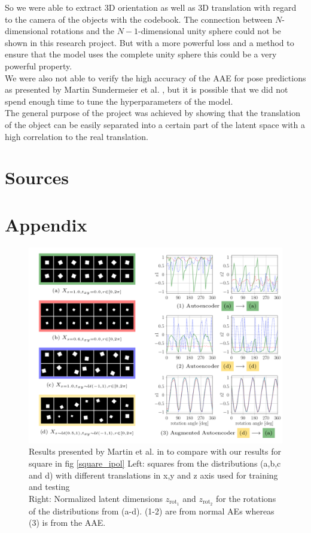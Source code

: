 \documentclass[10pt,a4paper]{article}
\newcommand{\rot}{\ensuremath{\text{rot}\xspace}}
\begin{document}
So we were able to extract 3D orientation as well as 3D translation with regard to the camera of the objects with the codebook.
The connection between $N$-dimensional rotations and the $N-1$-dimensional unity sphere could not be shown in this research project. But with a more powerful loss and a method to ensure that the model uses the complete unity sphere this could be a very powerful property.\\
We were also not able to verify the high accuracy of the AAE for pose predictions as presented by Martin Sundermeier et al. \cite{3D_Orientation_Learning}, but it is possible that we did not spend enough time to tune the hyperparameters of the model.\\
The general purpose of the project was achieved by showing that the translation of the object can be easily separated into a certain part of the latent space with a high correlation to the real translation.

 
\newpage
\section{Sources}\label{Sources}
\printbibliography

\newpage
\section{Appendix}
\begin{figure}
\center
\includegraphics[width = \linewidth]{MARTIN_Squares.png}
\caption{Results presented by Martin et al. in \cite{3D_Orientation_Learning} to compare with our results for square in fig \ref{square_ipol}
Left: squares from the distributions (a,b,c and d) with different translations in x,y and z axis used for training and testing\\
Right: Normalized latent dimensions $z_{\rot_1}$ and $z_{\rot_2}$ for the rotations of the distributions from (a-d). (1-2) are from normal AEs whereas (3) is from the AAE.}\label{SQUARE_Martin}
\end{figure}
\end{document}
